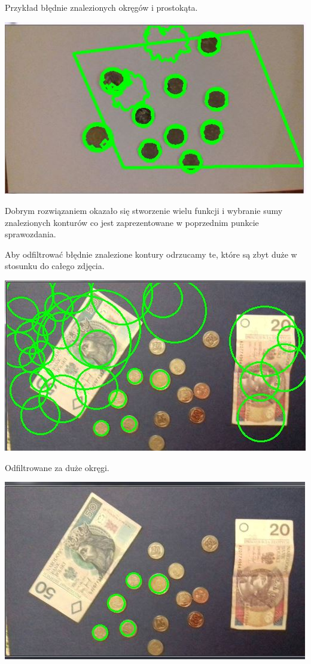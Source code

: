 \documentclass[12pt]{article}
\begin{document}
Przykład błędnie znalezionych okręgów i prostokąta.

\includegraphics[scale=0.8]{dziwnyRownoleglobok}

Dobrym rozwiązaniem okazało się stworzenie wielu funkcji i wybranie sumy znalezionych konturów co jest zaprezentowane w poprzednim punkcie sprawozdania. 

Aby odfiltrować błędnie znalezione kontury odrzucamy te, które są zbyt duże w stosunku do całego zdjęcia.

\includegraphics[scale=0.8]{zaduzo}

Odfiltrowane za duże okręgi.

\includegraphics[scale=0.8]{bezzaduzo}
\end{document}

